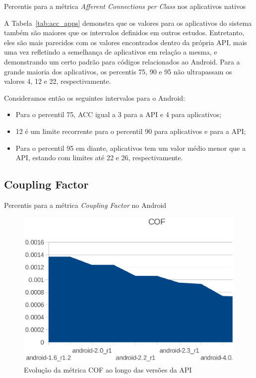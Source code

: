 \begin{table}[!htb]

\caption{Percentis para a métrica \textit{Afferent Connections per Class} nos aplicativos nativos}
\label{tab:acc_apps}
\end{table}

A Tabela~\ref{tab:acc_apps} demonstra que os valores para os aplicativos do sistema também são maiores que os intervalos definidos em outros estudos. Entretanto, eles são mais parecidos com os valores encontrados dentro da própria API, mais uma vez refletindo a semelhança de aplicativos em relação a mesma, e demonstrando um certo padrão para códigos relacionados ao Android. Para a grande maioria dos aplicativos, os percentis 75, 90 e 95 não ultrapassam os valores 4, 12 e 22, respectivamente.

Consideramos então os seguintes intervalos para o Android:

\begin{itemize}
\item Para o percentil 75, ACC igual a 3 para a API e 4 para aplicativos;
\item 12 é um limite recorrente para o percentil 90 para aplicativos e para a API;
\item Para o percentil 95 em diante, aplicativos tem um valor médio menor que a API, estando com limites até 22 e 26, respectivamente.
\end{itemize}

\subsection{Coupling Factor}

\begin{table}[!htb]
\begin{center}

\caption{Percentis para a métrica \textit{Coupling Factor} no Android}
\label{tab:cof_android}
\end{center}
\end{table}

\begin{figure}[!htb]
\centering
\includegraphics [keepaspectratio=true,scale=0.7]{figuras/graphs/cof_android.eps}
\caption{Evolução da métrica COF ao longo das versões da API}
\label{fig:cof_android}
\end{figure}

